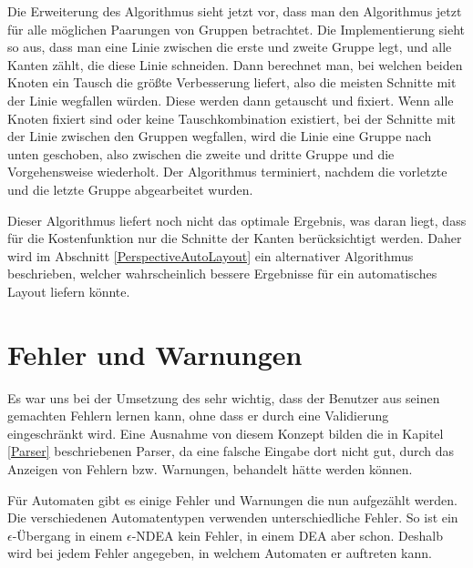 Die Erweiterung des Algorithmus sieht jetzt vor, dass man den Algorithmus jetzt
für alle möglichen Paarungen von Gruppen betrachtet. Die Implementierung
sieht so aus, dass man eine Linie zwischen die erste und zweite Gruppe legt, und
alle Kanten zählt, die diese Linie schneiden. Dann berechnet man, bei
welchen beiden Knoten ein Tausch die größte Verbesserung liefert, also die
meisten Schnitte mit der Linie wegfallen würden. Diese werden dann getauscht und
fixiert. Wenn alle Knoten fixiert sind oder keine Tauschkombination existiert,
bei der Schnitte mit der Linie zwischen den Gruppen wegfallen, wird die Linie
eine Gruppe nach unten geschoben, also zwischen die zweite und dritte Gruppe und
die Vorgehensweise wiederholt. Der Algorithmus terminiert, nachdem die vorletzte
und die letzte Gruppe abgearbeitet wurden.\vspace{10pt}

Dieser Algorithmus liefert noch nicht das optimale Ergebnis, was daran liegt,
dass für die Kostenfunktion nur die Schnitte der Kanten berücksichtigt werden.
Daher wird im Abschnitt \ref{PerspectiveAutoLayout} ein alternativer Algorithmus
beschrieben, welcher wahrscheinlich bessere Ergebnisse für ein automatisches
Layout liefern könnte.\vspace{10pt}


\section{Fehler und Warnungen}\label{InteractionMachine}

Es war uns bei der Umsetzung des \gtitools sehr wichtig, dass der Benutzer aus
seinen gemachten Fehlern lernen kann, ohne dass er durch eine Validierung
eingeschränkt wird. Eine Ausnahme von diesem Konzept bilden die in Kapitel
\ref{Parser} beschriebenen Parser, da eine falsche Eingabe dort nicht gut, durch
das Anzeigen von Fehlern bzw. Warnungen, behandelt hätte werden
können.\vspace{10pt}

Für Automaten gibt es einige Fehler und Warnungen die nun aufgezählt werden. Die
verschiedenen Automatentypen verwenden unterschiedliche Fehler. So ist ein
$\epsilon$-Übergang in einem $\epsilon$-NDEA kein Fehler, in einem DEA aber
schon. Deshalb wird bei jedem Fehler angegeben, in welchem Automaten er auftreten
kann.\vspace{10pt}

